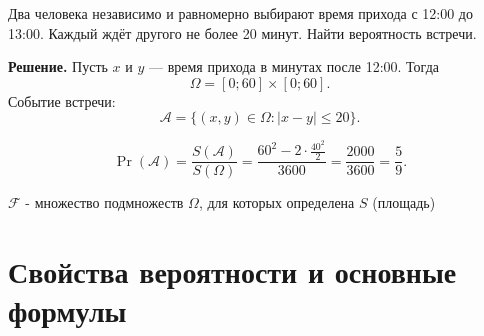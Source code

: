 \begin{example}
    Два человека независимо и равномерно выбирают время прихода
    с 12:00 до 13:00. Каждый ждёт другого не более 20 минут.
    Найти вероятность встречи.

    \textbf{Решение.}
    Пусть $x$ и $y$ --- время прихода в минутах после 12:00.
    Тогда
    \[
        \Omega = [0; 60] \times [0; 60].
    \]
    Событие встречи:
    \[
        \mathcal{A}
        = \{(x,y) \in \Omega \colon |x-y| \leq 20\}.
    \]

    \begin{center}
    \end{center}

    \[
        \Pr(\mathcal{A})
        = \frac{S(\mathcal{A})}{S(\Omega)}
        = \frac{60^2 - 2 \cdot \frac{40^2}{2}}{3600}
        = \frac{2000}{3600}
        = \frac{5}{9}.
    \]
\end{example}

\begin{exercise}[Замечание]
    $\mathcal{F}$ - множество подмножеств $\Omega$, для которых определена $S$ (площадь)
\end{exercise}


\section{Свойства вероятности и основные формулы}
